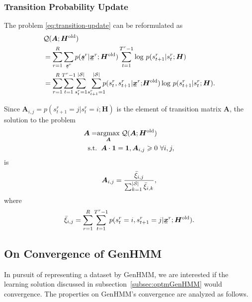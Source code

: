 \documentclass{ecai}
\newcommand{\ubar}[1]{\mkern2mu\underline{\mkern-2mu #1\mkern-2mu}\mkern2mu}
\newcommand{\ubmr}[2]{\ubar{\bm{#1}}^{#2}}
\newcommand{\smtr}[3]{{#1}^{#3}_{#2}}
\begin{document}
\subsubsection{Transition Probability Update}
The problem \eqref{eq:transition-update} can be reformulated as
\begin{align}
  &\Qq(\bm{A}; \bm{H}^{\mathrm{old}})\nonumber \\
  &= \sum_{r=1}^{R} \sum_{\ubmr{s}{r}}{p(\ubmr{s}{r}| \ubmr{x}{r}; \bm{H}^{\mathrm{old}})} \sum_{t=1}^{T^{r}-1}\log\,p(\smtr{s}{t+1}{r}|\smtr{s}{t}{r}; \bm{H}) \nonumber \\
  &= \sum_{r=1}^{R} \hspace{-0.1cm}\sum_{t=1}^{T^{r}-1}\hspace{-0.1cm} \sum_{\smtr{s}{t}{r}=1}^{|\Ss|}\hspace{-0.05cm}\sum_{\smtr{s}{t+1}{r}=1}^{|\Ss|}\hspace{-0.2cm}{p(\smtr{s}{t}{r}, \smtr{s}{t+1}{r}| \ubmr{x}{r};\hspace{-0.05cm} \bm{H}^{\mathrm{old}})} \log\,p(\smtr{s}{t+1}{r}|\smtr{s}{t}{r}; \bm{H}).
\end{align}

Since $\bm{A}_{i, j}  = p(\smtr{s}{t+1}{r}=j|\smtr{s}{t}{r}=i; \bm{H})$ is the element of transition matrix $\bm{A}$, the solution to the problem
\begin{align}\label{eq:update-transition-prob}
  \bm{A} = &\underset{\bm{A}}{\operatorname{argmax}}\; \mathcal{Q}(\bm{A}; \bm{H}^{\mathrm{old}}) \nonumber \\
  \mathrm{s.t.} &\hspace{0.2cm} \bm{A} \cdot \bm{1} = \bm{1}, \bm{A}_{i,j} \geqslant 0 \,\, \forall i,j,
\end{align}
is
\begin{equation}
  \bm{A}_{i,j} = \frac{\bar{\xi}_{i,j}}{\sum_{k = 1}^{|\mathcal{S}|} \bar{\xi}_{i,k}},
\end{equation}
where
\begin{equation}\label{eq:update-transition-solt}
  \bar{\xi}_{i,j} = \sum_{r= 1}^{R} \sum_{t= 1}^{T^{r}-1}{p(\smtr{s}{t}{r}=i, \smtr{s}{t+1}{r}=j| \ubmr{x}{r}; \bm{H}^{\mathrm{old}})}.
\end{equation}
\subsection{On Convergence of GenHMM}
In pursuit of representing a dataset by GenHMM,  we are interested if the learning solution discussed in subsection~\ref{subsec:optmGenHMM} would convergence. The properties on GenHMM's convergence are analyzed as follows.
\end{document}
